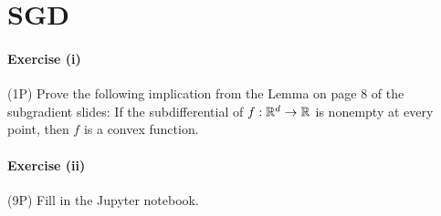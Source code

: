 \documentclass{scrartcl}
\theoremstyle{definition}
\begin{document}
\section*{SGD}%



\paragraph{Exercise (i)} (1P) Prove the following implication from the Lemma on page 8 of the subgradient slides: If the subdifferential of $f: \mathbb{R}^d \to \mathbb{R}$ is nonempty at every point, then $f$ is a convex function.

\paragraph{Exercise (ii)} (9P)  Fill in the Jupyter notebook.
\end{document}
